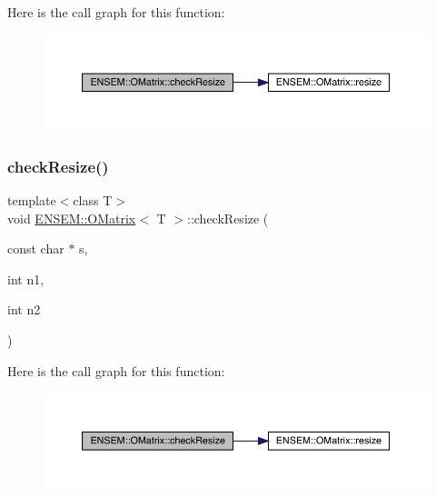Here is the call graph for this function\+:
\nopagebreak
\begin{figure}[H]
\begin{center}
\leavevmode
\includegraphics[width=350pt]{dd/d80/classENSEM_1_1OMatrix_aa9d9ff7da2027f85535b36b472ef125b_cgraph}
\end{center}
\end{figure}
\mbox{\label{classENSEM_1_1OMatrix_aa9d9ff7da2027f85535b36b472ef125b}} 
\subsubsection{\texorpdfstring{checkResize()}{checkResize()}\hspace{0.1cm}{\footnotesize\ttfamily [6/9]}}
{\footnotesize\ttfamily template$<$class T$>$ \\
void \mbox{\hyperlink{classENSEM_1_1OMatrix}{E\+N\+S\+E\+M\+::\+O\+Matrix}}$<$ T $>$\+::check\+Resize (\begin{DoxyParamCaption}\item[{const char $\ast$}]{s,  }\item[{int}]{n1,  }\item[{int}]{n2 }\end{DoxyParamCaption})\hspace{0.3cm}{\ttfamily [inline]}}

Here is the call graph for this function\+:
\nopagebreak
\begin{figure}[H]
\begin{center}
\leavevmode
\includegraphics[width=350pt]{dd/d80/classENSEM_1_1OMatrix_aa9d9ff7da2027f85535b36b472ef125b_cgraph}
\end{center}
\end{figure}
\mbox{\label{classENSEM_1_1OMatrix_a532d2138ecffc7a153b831401ca8b4df}} 
